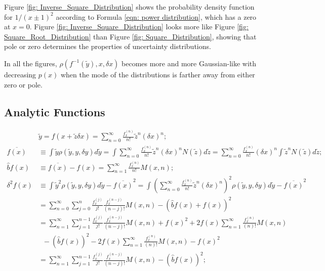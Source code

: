 \documentclass[twoside]{article}
\numberwithin{equation}{section}
\begin{document}
Figure \ref{fig: Inverse_Square_Distribution} shows the probability density function for $1/(x \pm 1)^2$ according to Formula \eqref{eqn: power distribution}, which has a zero at $x=0$.
Figure \ref{fig: Inverse_Square_Distribution} looks more like Figure \ref{fig: Square_Root_Distribution} than Figure \ref{fig: Square_Distribution}, showing that pole or zero determines the properties of uncertainty distributions.

In all the figures, $\rho(f^{-1}(\tilde{y}), x, \delta x)$ becomes more and more Gaussian-like with decreasing $p(x)$ when the mode of the distributions is farther away from either zero or pole.
 



\subsection{Analytic Functions}

\iffalse

\begin{align*}
& \tilde{y} = f(x + \tilde{z} \delta x) = \sum_{n=0}^{\infty} \frac{f^{(n)}_x}{n!} \tilde{z}^n (\delta x)^n; \\
\overline{f(x)} &\equiv \int \tilde{y} \rho(\tilde{y}, y, \delta y) d \tilde{y}
 = \int \sum_{n=0}^{\infty} \frac{f^{(n)}_x}{n!} \tilde{z}^n (\delta x)^n N(\tilde{z}) d \tilde{z}
 = \sum_{n=0}^{\infty} \frac{f^{(n)}_x}{n!} (\delta x)^{n} \int \tilde{z}^n N(\tilde{z}) d \tilde{z}; \\
\hat{b} f(x) &\equiv \overline{f(x)} - f(x) = \sum_{n=1}^{\infty} \frac{f^{(n)}_x}{n!} M(x,n); \\
\delta^2 f(x) &\equiv \int \tilde{y}^2 \rho(\tilde{y}, y, \delta y) d \tilde{y} - \overline{f(x)}^2
 = \int (\sum_{n=0}^{\infty} \frac{f^{(n)}_x}{n!} \tilde{z}^n (\delta x)^n)^2 \rho(\tilde{y}, y, \delta y) d \tilde{y} - \overline{f(x)}^2 \\
&= \sum_{n=0}^{\infty} \sum_{j=0}^{n} \frac{f^{(j)}_x}{j!} \frac{f^{(n-j)}_x}{(n-j)!} M(x, n)
 - \left(\hat{b} f(x) + f(x) \right)^2 \\
&= \sum_{n=1}^{\infty} \sum_{j=1}^{n-1} \frac{f^{(j)}_x}{j!} \frac{f^{(n-j)}_x}{(n-j)!} M(x, n) + f(x)^2
 + 2 f(x) \sum_{n=1}^{\infty} \frac{f^{(n)}_x}{(n)!} M(x, n) \\
&\;\;- (\hat{b} f(x))^2 - 2 f(x) \sum_{n=1}^{\infty} \frac{f^{(n)}_x}{(n)!} M(x, n) - f(x)^2  \\
&= \sum_{n=1}^{\infty} \sum_{j=1}^{n-1} \frac{f^{(j)}_x}{j!} \frac{f^{(n-j)}_x}{(n-j)!} M(x, n) - (\hat{b} f(x))^2;
\end{align*}
\end{document}
